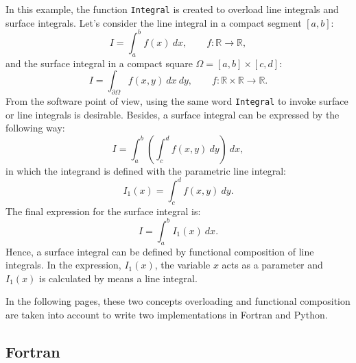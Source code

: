 In this example, the function \texttt{Integral} is created to overload line integrals 
and surface integrals. 
Let's consider the  line integral in a compact segment $[a, b]$: 
\begin{equation}   
    I =  \int _a ^b f(x) \ dx, \qquad f: \mathbb{R} \rightarrow \mathbb{R},   
\end{equation} 
and the surface integral in a compact square $ \Omega = [a, b] \times [c,d]$:   
\begin{equation}   
    I =  \int _{\partial \Omega} f(x, y) \ dx \ dy, 
    \qquad f: \mathbb{R}\times \mathbb{R} \rightarrow \mathbb{R}.   
\end{equation} 
From the software point of view, using the same word \texttt{Integral}
to invoke surface or line integrals is desirable. 
Besides, a surface integral can be expressed by the following way: 
\begin{equation}   
    I =  \int _{a} ^b \left(   \int _{c} ^d f(x,y) \ dy      \right) \ dx,
\end{equation} 
in which the integrand is defined with the parametric line integral:
\begin{equation}   
   I_1(x) = \int _{c} ^d f(x,y) \ dy.  
   \label{I1}   
\end{equation} 
The final expression for the surface integral is:  
\begin{equation}   
    I =   \int _{a} ^b I_1(x) \ dx. 
    \label{I2D}  
\end{equation} 
Hence, a surface integral can be defined by functional composition of line integrals. 
In the expression,  $ I_1(x) $, the variable $ x $ acts as a parameter
and $ I_1(x) $ is calculated by means a line integral. 
 
In the following pages, these two concepts overloading and functional composition
are taken into account to write two implementations in Fortran and Python. 

 
\newpage  
\subsection*{Fortran}

\renewcommand{\home}{./Fortran/sources/Advanced_programming/overloading} 
\lstfor

